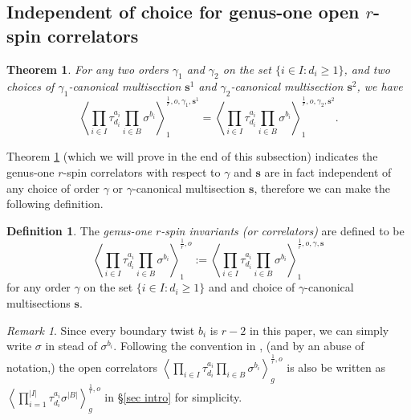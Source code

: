 \documentclass[11pt]{amsart}
\newtheorem{thm}[dummy]{Theorem}
\theoremstyle{definition}
\newtheorem{definition}[dummy]{Definition}
\theoremstyle{remark}
\newtheorem{rmk}[dummy]{Remark}
\newcommand{\<}{\left<}
\renewcommand{\>}{\right>}
\numberwithin{equation}{section}
\begin{document}
\subsection{Independent of choice for genus-one open $r$-spin correlators}\label{sec g=1 indepent of choice and trr}
\begin{thm}\label{thm indenpdent of order}
     For any two orders $\gamma_1$ and $\gamma_2$ on the set $\{i\in I\colon d_i\ge 1\}$, and two choices of $\gamma_1$-canonical multisection $\bm{s}^1$ and $\gamma_2$-canonical multisection $\bm{s}^2$, we have
  \begin{equation}\label{eq indep of choice g=1}
  \left\langle \prod_{i\in I}\tau^{a_i}_{d_i}\prod_{i\in B}\sigma^{b_i}\right\rangle^{\frac{1}{r},o,\gamma_1,\bm{s}^1}_1=\left\langle \prod_{i\in I}\tau^{a_i}_{d_i}\prod_{i\in B}\sigma^{b_i}\right\rangle^{\frac{1}{r},o,\gamma_2,\bm{s}^2}_1.
  \end{equation}
\end{thm}

Theorem \ref{thm indenpdent of order} (which we will prove in the end of this subsection) indicates the genus-one $r$-spin correlators with respect to $\gamma$ and $\bm{s}$ are in fact independent of any choice of order $\gamma$ or $\gamma$-canonical multisection $\bm{s}$, therefore we can make the following definition.
\begin{definition}\label{def correlator unordered}
The \textit{genus-one $r$-spin invariants (or correlators)} are defined to be
    $$\left\langle \prod_{i\in I}\tau^{a_i}_{d_i}\prod_{i\in B}\sigma^{b_i}\right\rangle^{\frac{1}{r},o}_1:=\left\langle \prod_{i\in I}\tau^{a_i}_{d_i}\prod_{i\in B}\sigma^{b_i}\right\rangle^{\frac{1}{r},o,\gamma,\bm{s}}_1
  $$
for any order $\gamma$ on the set $\{i\in I\colon d_i\ge 1\}$ and and choice of $\gamma$-canonical multisections $\bm{s}$.
  \end{definition}
  \begin{rmk}
    Since every boundary twist $b_i$ is $r-2$ in this paper, we can simply write $\sigma$ in stead of $\sigma^{b_i}$. Following the convention in \cite{BCT2}, (and by an abuse of notation,) the open correlators $\left\langle \prod_{i\in I}\tau^{a_i}_{d_i}\prod_{i\in B}\sigma^{b_i}\right\rangle^{\frac{1}{r},o}_g$ is also be written as $\left\langle \prod_{i=1}^{\lvert I \rvert}\tau^{a_i}_{d_i}\sigma^{\lvert B \rvert}\right\rangle^{\frac{1}{r},o}_g$ in \S \ref{sec intro} for simplicity.
\end{rmk}
\end{document}
